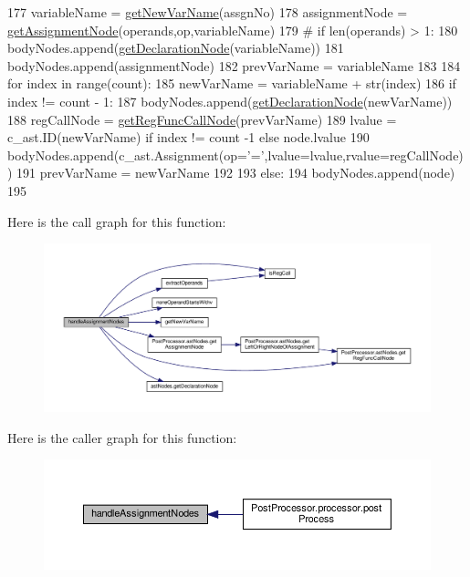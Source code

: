 \begin{DoxyCode}
177         variableName = \hyperlink{namespacePostProcessor_1_1utils_a69c4094b747eccefbd43b8011b1c3626}{getNewVarName}(assgnNo)
178         assignmentNode = \hyperlink{namespacePostProcessor_1_1astNodes_aa6c634c9a1dceb3e9cc65cadadf5f450}{getAssignmentNode}(operands,op,variableName)
179         \textcolor{comment}{# if len(operands) > 1:
}
180         bodyNodes.append(\hyperlink{namespaceastNodes_ae5e5c7f09a1586002b20db6d72f6d30b}{getDeclarationNode}(variableName))
181         bodyNodes.append(assignmentNode)
182         prevVarName = variableName
183 
184         \textcolor{keywordflow}{for} index \textcolor{keywordflow}{in} range(count):
185             newVarName = variableName + str(index)
186             \textcolor{keywordflow}{if} index != count - 1:
187                 bodyNodes.append(\hyperlink{namespaceastNodes_ae5e5c7f09a1586002b20db6d72f6d30b}{getDeclarationNode}(newVarName))
188             regCallNode = \hyperlink{namespacePostProcessor_1_1astNodes_a30de65f8e1753733f88a01d42927ef1b}{getRegFuncCallNode}(prevVarName)
189             lvalue = c\_ast.ID(newVarName) \textcolor{keywordflow}{if} index != count -1 \textcolor{keywordflow}{else} node.lvalue
190             bodyNodes.append(c\_ast.Assignment(op=\textcolor{stringliteral}{'='},lvalue=lvalue,rvalue=regCallNode))
191             prevVarName = newVarName
192         
193     \textcolor{keywordflow}{else}:
194         bodyNodes.append(node)
195     
\end{DoxyCode}
Here is the call graph for this function\+:\nopagebreak
\begin{figure}[H]
\begin{center}
\leavevmode
\includegraphics[width=350pt]{namespacePostProcessor_1_1utils_a8b77a1f205d7dac14e6bdcccdb61e5f6_cgraph}
\end{center}
\end{figure}
Here is the caller graph for this function\+:\nopagebreak
\begin{figure}[H]
\begin{center}
\leavevmode
\includegraphics[width=350pt]{namespacePostProcessor_1_1utils_a8b77a1f205d7dac14e6bdcccdb61e5f6_icgraph}
\end{center}
\end{figure}
